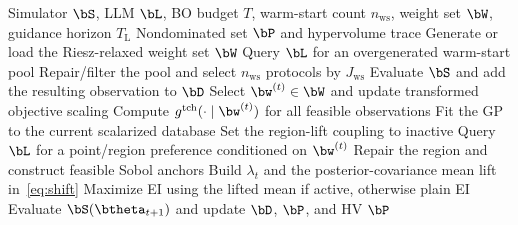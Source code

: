 \raggedbottom
\begin{algorithm}[H]
\caption{LLMBO-MO}
\label{alg:llmbo}
\footnotesize
\begin{algorithmic}[1]
\Require Simulator $\bS$, LLM $\bL$, BO budget $T$, warm-start count
$n_{\mathrm{ws}}$, weight set $\bW$, guidance horizon $T_{\mathrm L}$
\Ensure Nondominated set $\bP$ and hypervolume trace
\State Generate or load the Riesz-relaxed weight set $\bW$
\State Query $\bL$ for an overgenerated warm-start pool
\State Repair/filter the pool and select $n_{\mathrm{ws}}$ protocols by
$J_{\mathrm{ws}}$
    \State Evaluate $\bS$ and add the resulting observation to $\bD$
\EndFor
{}
    \State Select $\bw^{(t)}\in\bW$ and update transformed objective scaling
    \State Compute $g^{\mathrm{tch}}(\cdot\mid\bw^{(t)})$ for all feasible observations
    \State Fit the GP to the current scalarized database
    \State Set the region-lift coupling to inactive
        \State Query $\bL$ for a point/region preference conditioned on $\bw^{(t)}$
        \State Repair the region and construct feasible Sobol anchors
            \State Build $\lambda_t$ and the posterior-covariance mean lift in~\eqref{eq:shift}
        \EndIf
    \EndIf
    \State Maximize EI using the lifted mean if active, otherwise plain EI
    \State Evaluate $\bS(\btheta_{t+1})$ and update $\bD$, $\bP$, and HV
\EndFor
\State \Return $\bP$
\end{algorithmic}
\end{algorithm}
\flushbottom
